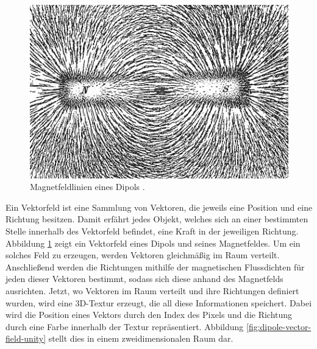 \begin{figure}
  \includegraphics[width=\columnwidth]{dipole-vector-field}
  \caption{Magnetfeldlinien eines Dipols \cite{black1913practical}.}
  \label{fig:dipole-vector-field}
\end{figure}

Ein Vektorfeld ist eine Sammlung von Vektoren, die jeweils eine Position
und eine Richtung besitzen. Damit erfährt jedes Objekt, welches sich an einer
bestimmten Stelle innerhalb des Vektorfeld befindet, eine Kraft in der
jeweiligen Richtung. Abbildung \ref{fig:dipole-vector-field} zeigt ein
Vektorfeld eines Dipols und seines Magnetfeldes. Um ein solches Feld zu erzeugen,
werden Vektoren gleichmäßig im Raum verteilt. Anschließend werden die Richtungen
mithilfe der magnetischen Flussdichten für jeden dieser Vektoren bestimmt, sodass
sich diese anhand des Magnetfelds ausrichten. Jetzt, wo Vektoren im Raum
verteilt und ihre Richtungen definiert wurden, wird eine 3D-Textur erzeugt, die
all diese Informationen speichert. Dabei wird die Position eines Vektors durch
den Index des Pixels und die Richtung durch eine Farbe innerhalb der Textur
repräsentiert. Abbildung \ref{fig:dipole-vector-field-unity} stellt dies in einem
zweidimensionalen Raum dar.

